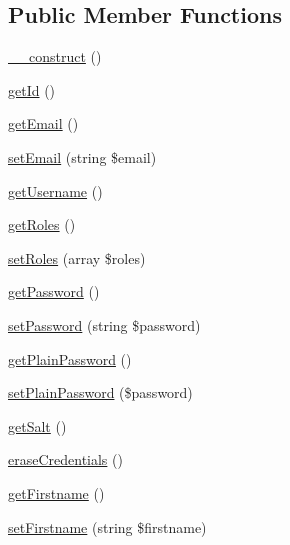 \subsection*{Public Member Functions}
\begin{DoxyCompactItemize}
\item 
\mbox{\hyperlink{class_app_1_1_entity_1_1_user_a095c5d389db211932136b53f25f39685}{\+\_\+\+\_\+construct}} ()
\item 
\mbox{\hyperlink{class_app_1_1_entity_1_1_user_a12251d0c022e9e21c137a105ff683f13}{get\+Id}} ()
\item 
\mbox{\hyperlink{class_app_1_1_entity_1_1_user_a02a01849f28e2535e888ae4ec87b20f2}{get\+Email}} ()
\item 
\mbox{\hyperlink{class_app_1_1_entity_1_1_user_a2d22391fa86fa0eaf3b9d2a3c29880bc}{set\+Email}} (string \$email)
\item 
\mbox{\hyperlink{class_app_1_1_entity_1_1_user_a81b37a3c9d639574e394f80c1138c75e}{get\+Username}} ()
\item 
\mbox{\hyperlink{class_app_1_1_entity_1_1_user_aa676cae5ee8d7fb6862a8724adc2660d}{get\+Roles}} ()
\item 
\mbox{\hyperlink{class_app_1_1_entity_1_1_user_aa3236c9c6688d04df16ea0ab3065530e}{set\+Roles}} (array \$roles)
\item 
\mbox{\hyperlink{class_app_1_1_entity_1_1_user_a04e0957baeb7acde9c0c86556da2d43f}{get\+Password}} ()
\item 
\mbox{\hyperlink{class_app_1_1_entity_1_1_user_a81e0f429784973551fb5417d5b92b0db}{set\+Password}} (string \$password)
\item 
\mbox{\hyperlink{class_app_1_1_entity_1_1_user_a012b24a32df874330cfcb2ede1327447}{get\+Plain\+Password}} ()
\item 
\mbox{\hyperlink{class_app_1_1_entity_1_1_user_ae913df04d7e01f3b547d4dc65f9dffd6}{set\+Plain\+Password}} (\$password)
\item 
\mbox{\hyperlink{class_app_1_1_entity_1_1_user_a1dfe56d2c965d451a135f3f3910a8b8d}{get\+Salt}} ()
\item 
\mbox{\hyperlink{class_app_1_1_entity_1_1_user_ac565b8c00fe93ce673f8237849f072a6}{erase\+Credentials}} ()
\item 
\mbox{\hyperlink{class_app_1_1_entity_1_1_user_a42c9621713b6dcdfb9edd5a7630b6d93}{get\+Firstname}} ()
\item 
\mbox{\hyperlink{class_app_1_1_entity_1_1_user_a102793bdeeaa7eaa2bca4e31eb3782e5}{set\+Firstname}} (string \$firstname)
\item 

\end{DoxyCompactItemize}
